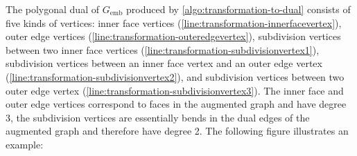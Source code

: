 The polygonal dual of $G_\text{emb}$ produced by \cref{algo:transformation-to-dual} consists of five kinds of vertices: inner face vertices (\cref{line:transformation-innerfacevertex}), outer edge vertices (\cref{line:transformation-outeredgevertex}), subdivision vertices between two inner face vertices (\cref{line:transformation-subdivisionvertex1}), subdivision vertices between an inner face vertex and an outer edge vertex (\cref{line:transformation-subdivisionvertex2}), and subdivision vertices between two outer edge vertex (\cref{line:transformation-subdivisionvertex3}). The inner face and outer edge vertices correspond to faces in the augmented graph and have degree 3, the subdivision vertices are essentially bends in the dual edges of the augmented graph and therefore have degree 2. The following figure illustrates an example:
%
\begin{figure}[H]
	\centering
	\quad
	\quad

\end{figure}
